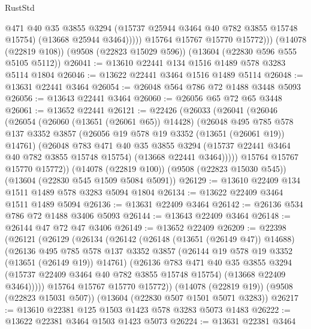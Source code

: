 \begin{lexlean}{RustStd}
\begin{coremodule}
                  @471
                  @40
                  @35
                  @3855
                  @3294
                  (@15737 @25944 @3464 @40 @782 @3855 @15748 @15754)
                  (@13668 @25944 @3464)))))
          @15764
          @15767
          @15770
          @15772)))
    (@14078 (@22819 @108))
    (@9508 (@22823 @15029 @596))
    (@13604 (@22830 @596 @555 @5105 @5112))
@26041 := @13610 @22441 @134 @1516 @1489 @578 @3283 @5114 @1804
@26046 := @13622 @22441 @3464 @1516 @1489 @5114
@26048 := @13631 @22441 @3464
@26054 := @26048 @564 @786 @72 @1488 @3448 @5093
@26056 := @13643 @22441 @3464
@26060 := @26056 @65 @72 @65 @3448
@26061 := @13652 @22441
@26121 := @22426
    (@26033
      (@26041
        (@26046
          (@26054
            (@26060 (@13651 (@26061 @65)) @14428)
            (@26048
              @495
              @785
              @578
              @137
              @3352
              @3857
              (@26056 @19 @578 @19 @3352 (@13651 (@26061 @19)) @14761)
              (@26048
                @783
                @471
                @40
                @35
                @3855
                @3294
                (@15737 @22441 @3464 @40 @782 @3855 @15748 @15754)
                (@13668 @22441 @3464)))))
        @15764
        @15767
        @15770
        @15772))
    (@14078 (@22819 @100))
    (@9508 (@22823 @15030 @545))
    (@13604 (@22830 @545 @1509 @5084 @5091))
@26129 := @13610 @22409 @134 @1511 @1489 @578 @3283 @5094 @1804
@26134 := @13622 @22409 @3464 @1511 @1489 @5094
@26136 := @13631 @22409 @3464
@26142 := @26136 @534 @786 @72 @1488 @3406 @5093
@26144 := @13643 @22409 @3464
@26148 := @26144 @47 @72 @47 @3406
@26149 := @13652 @22409
@26209 := @22398
    (@26121
      (@26129
        (@26134
          (@26142
            (@26148 (@13651 (@26149 @47)) @14688)
            (@26136
              @495
              @785
              @578
              @137
              @3352
              @3857
              (@26144 @19 @578 @19 @3352 (@13651 (@26149 @19)) @14761)
              (@26136
                @783
                @471
                @40
                @35
                @3855
                @3294
                (@15737 @22409 @3464 @40 @782 @3855 @15748 @15754)
                (@13668 @22409 @3464)))))
        @15764
        @15767
        @15770
        @15772))
    (@14078 (@22819 @19))
    (@9508 (@22823 @15031 @507))
    (@13604 (@22830 @507 @1501 @5071 @3283))
@26217 := @13610 @22381 @125 @1503 @1423 @578 @3283 @5073 @1483
@26222 := @13622 @22381 @3464 @1503 @1423 @5073
@26224 := @13631 @22381 @3464

\end{coremodule}
\end{lexlean}
